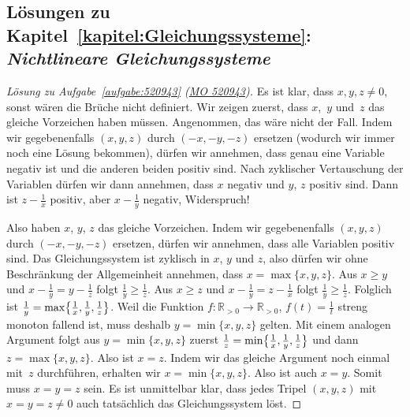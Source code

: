 \subsection*{Lösungen zu Kapitel~\ref{kapitel:Gleichungssysteme}: \emph{Nichtlineare Gleichungssysteme}}

\begin{proof}[Lösung zu Aufgabe~\ref{aufgabe:520943} \textmd{(\href{https://www.mathematik-olympiaden.de/moev/index.php?option=com_download&thema=a&format=raw&datei=A52094a.pdf}{MO 520943})}]
	Es ist klar, dass $x,y,z\neq 0$, sonst wären die Brüche nicht definiert. Wir zeigen zuerst, dass $x$,~$y$ und~$z$ das gleiche Vorzeichen haben müssen. Angenommen, das wäre nicht der Fall. Indem wir gegebenenfalls $(x,y,z)$ durch $(-x,-y,-z)$ ersetzen (wodurch wir immer noch eine Lösung bekommen), dürfen wir annehmen, dass genau eine Variable negativ ist und die anderen beiden positiv sind. Nach zyklischer Vertauschung der Variablen dürfen wir dann annehmen, dass $x$ negativ und $y$, $z$ positiv sind. Dann ist $z-\frac 1x$ positiv, aber $x-\frac 1y$ negativ, Widerspruch!
	
	Also haben $x$, $y$, $z$ das gleiche Vorzeichen. Indem wir gegebenenfalls $(x,y,z)$ durch $(-x,-y,-z)$ ersetzen, dürfen wir annehmen, dass alle Variablen positiv sind. Das Gleichungssystem ist zyklisch in $x$, $y$ und $z$, also dürfen wir ohne Beschränkung der Allgemeinheit annehmen, dass $x=\max\{x,y,z\}$. Aus $x\geqslant y$ und $x-\frac 1y=y-\frac 1z$ folgt $\frac 1y\geqslant \frac 1z$. Aus $x\geqslant z$ und $x-\frac 1y=z-\frac 1x$ folgt $\frac 1y\geqslant \frac 1z$. Folglich ist $\frac 1y=\max\braces[\big]{\frac 1x,\frac 1y,\frac 1z}$. Weil die Funktion $f\colon \mathbb R_{>0}\rightarrow \mathbb R_{>0}$, $f(t)=\frac 1t$ streng monoton fallend ist, muss deshalb $y=\min\{x,y,z\}$ gelten. Mit einem analogen Argument folgt aus $y=\min\{x,y,z\}$ zuerst $\frac 1z=\min\braces[\big]{\frac 1x,\frac 1y,\frac 1z}$ und dann $z=\max\{x,y,z\}$. Also ist $x=z$. Indem wir das gleiche Argument noch einmal mit~$z$ durchführen, erhalten wir $x=\min\{x,y,z\}$. Also ist auch $x=y$. Somit muss $x=y=z$ sein. Es ist unmittelbar klar, dass jedes Tripel $(x,y,z)$ mit $x=y=z\neq 0$ auch tatsächlich das Gleichungssystem löst.
\end{proof}
